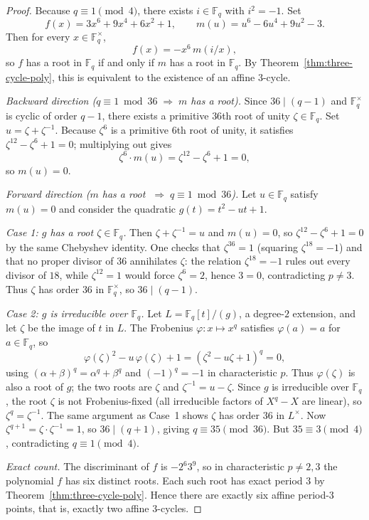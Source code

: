 \documentclass[11pt]{article}
\newcommand{\F}{\mathbb{F}}
\begin{document}
\begin{proof}
Because $q\equiv 1\pmod4$, there exists $i\in\F_q$ with $i^2=-1$.
Set
\[
f(x)=3x^6+9x^4+6x^2+1,
\qquad
m(u)=u^6-6u^4+9u^2-3.
\]
Then for every $x\in\F_q^\times$,
\[
f(x)=-x^6\,m(i/x),
\]
so $f$ has a root in $\F_q$ if and only if $m$ has a root in $\F_q$.
By Theorem~\ref{thm:three-cycle-poly}, this is equivalent to the existence of an affine $3$-cycle.

\smallskip\noindent\textit{Backward direction ($q\equiv 1\bmod{36}\;\Longrightarrow\;m$ has a root).}
Since $36\mid(q-1)$ and $\F_q^\times$ is cyclic of order $q-1$, there exists a primitive $36$th root of unity $\zeta\in\F_q$.
Set $u=\zeta+\zeta^{-1}$.
Because $\zeta^6$ is a primitive $6$th root of unity, it satisfies $\zeta^{12}-\zeta^6+1=0$; multiplying out gives
\[
\zeta^6\cdot m(u)=\zeta^{12}-\zeta^6+1=0,
\]
so $m(u)=0$.

\smallskip\noindent\textit{Forward direction ($m$ has a root $\;\Longrightarrow\;q\equiv 1\bmod{36}$).}
Let $u\in\F_q$ satisfy $m(u)=0$ and consider the quadratic $g(t)=t^2-ut+1$.

\emph{Case 1: $g$ has a root $\zeta\in\F_q$.}
Then $\zeta+\zeta^{-1}=u$ and $m(u)=0$, so $\zeta^{12}-\zeta^6+1=0$ by the same Chebyshev identity.
One checks that $\zeta^{36}=1$ (squaring $\zeta^{18}=-1$) and that no proper divisor of $36$ annihilates $\zeta$: the relation $\zeta^{18}=-1$ rules out every divisor of $18$, while $\zeta^{12}=1$ would force $\zeta^6=2$, hence $3=0$, contradicting $p\neq 3$.
Thus $\zeta$ has order $36$ in $\F_q^\times$, so $36\mid (q-1)$.

\emph{Case 2: $g$ is irreducible over $\F_q$.}
Let $L=\F_q[t]/(g)$, a degree-$2$ extension, and let $\zeta$ be the image of $t$ in $L$.
The Frobenius $\varphi\colon x\mapsto x^q$ satisfies $\varphi(a)=a$ for $a\in\F_q$, so
\[
\varphi(\zeta)^2-u\,\varphi(\zeta)+1=(\zeta^2-u\zeta+1)^q=0,
\]
using $(\alpha+\beta)^q=\alpha^q+\beta^q$ and $(-1)^q=-1$ in characteristic $p$.
Thus $\varphi(\zeta)$ is also a root of $g$; the two roots are $\zeta$ and $\zeta^{-1}=u-\zeta$.
Since $g$ is irreducible over $\F_q$, the root $\zeta$ is not Frobenius-fixed (all irreducible factors of $X^q-X$ are linear), so $\zeta^q=\zeta^{-1}$.
The same argument as Case~1 shows $\zeta$ has order $36$ in $L^\times$.
Now $\zeta^{q+1}=\zeta\cdot\zeta^{-1}=1$, so $36\mid(q+1)$, giving $q\equiv 35\pmod{36}$.
But $35\equiv 3\pmod4$, contradicting $q\equiv 1\pmod4$.

\smallskip\noindent\textit{Exact count.}
The discriminant of $f$ is $-2^6 3^9$, so in characteristic $p\neq 2,3$ the polynomial $f$ has six distinct roots.
Each such root has exact period $3$ by Theorem~\ref{thm:three-cycle-poly}.
Hence there are exactly six affine period-$3$ points, that is, exactly two affine $3$-cycles.
\end{proof}
\end{document}

